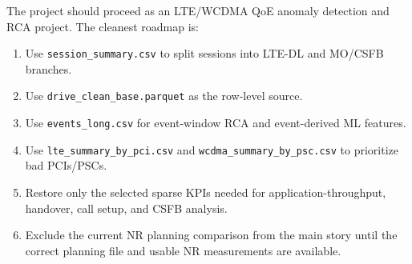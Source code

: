 \documentclass[12pt,a4paper]{article}
\begin{document}
The project should proceed as an LTE/WCDMA QoE anomaly detection and RCA project. The cleanest roadmap is:
\begin{enumerate}
    \item Use \texttt{session\_summary.csv} to split sessions into LTE-DL and MO/CSFB branches.
    \item Use \texttt{drive\_clean\_base.parquet} as the row-level source.
    \item Use \texttt{events\_long.csv} for event-window RCA and event-derived ML features.
    \item Use \texttt{lte\_summary\_by\_pci.csv} and \texttt{wcdma\_summary\_by\_psc.csv} to prioritize bad PCIs/PSCs.
    \item Restore only the selected sparse KPIs needed for application-throughput, handover, call setup, and CSFB analysis.
    \item Exclude the current NR planning comparison from the main story until the correct planning file and usable NR measurements are available.
\end{enumerate}
\end{document}
